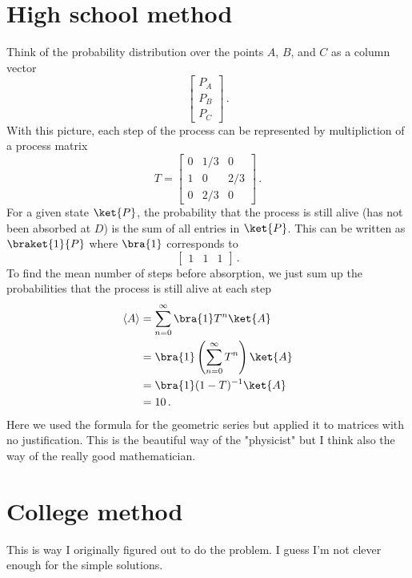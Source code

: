 \documentclass{article}
\begin{document}
\section{High school method}

Think of the probability distribution over the points $A$, $B$, and $C$ as a column vector
\begin{equation}
\left[ \begin{matrix} P_A \\ P_B \\ P_C \end{matrix} \right] \, .
\end{equation}
With this picture, each step of the process can be represented by multipliction of a process matrix
\begin{equation}
T = \left[ \begin{matrix} 0 & 1/3 & 0 \\ 1 & 0 & 2/3 \\ 0 & 2/3 & 0 \end{matrix} \right] \, .
\end{equation}
For a given state $\ket{P}$, the probability that the process is still alive (has not been absorbed at $D$) is the sum of all entries in $\ket{P}$.
This can be written as $\braket{1}{P}$ where $\bra{1}$ corresponds to \begin{equation}
\left[ \begin{matrix} 1 & 1 & 1 \end{matrix} \right] \, .
\end{equation}
To find the mean number of steps before absorption, we just sum up the probabilities that the process is still alive at each step \begin{align*}
\langle A \rangle &= \sum_{n=0}^{\infty} \bra{1} T^n \ket{A} \\
&= \bra{1} \left( \sum_{n=0}^{\infty} T^n \right) \ket{A} \\
&= \bra{1} (1-T)^{-1} \ket{A} \\
&= 10 \, .
\end{align*}
Here we used the formula for the geometric series but applied it to matrices with no justification.
This is the beautiful way of the "physicist" but I think also the way of the really good mathematician.


\section{College method}

This is way I originally figured out to do the problem. I guess I'm not clever enough for the simple solutions.
\end{document}

